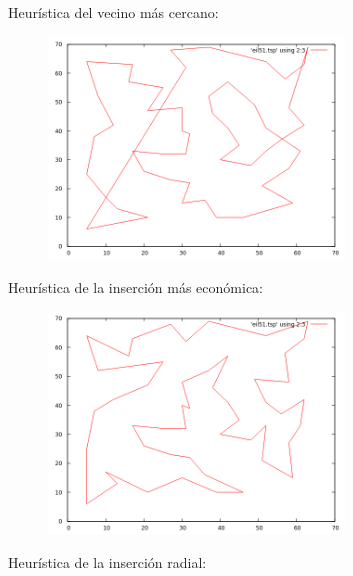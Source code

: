 \documentclass[11pt,a4paper]{article}
\begin{document}
\newpage

				\par
				Heurística del vecino más cercano:

				\vspace{5mm}

				\begin{figure}[h]

					\centering
					\includegraphics[width=0.7\textwidth]{eil51VMC.png}
					
				\end{figure}

				\par
				Heurística de la inserción más económica:

				\vspace{5mm}

				\begin{figure}[h]

					\centering
					\includegraphics[width=0.7\textwidth]{eil51IM.png}
					
				\end{figure}

\newpage

				\par
				Heurística de la inserción radial:
\end{document}
